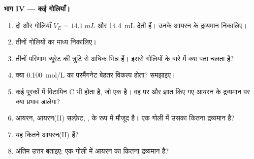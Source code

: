 \begin{problem}
\medskip
\noindent\textbf{भाग IV --- कई गोलियाँ।}
\begin{enumerate}[resume]
  \item दो और गोलियाँ $V_E = \qty{14.1}{mL}$ और
        \qty{14.4}{mL} देती हैं। उनके आयरन के द्रव्यमान निकालिए।
  \item तीनों गोलियों का माध्य निकालिए।
  \item तीनों परिणाम ब्यूरेट की त्रुटि से अधिक भिन्न हैं। इससे
        गोलियों के बारे में क्या पता चलता है?
  \item क्या \qty{0.100}{mol/L} का परमैंगनेट बेहतर
        विकल्प होता? समझाइए।
  \item कई पूरकों में विटामिन C भी होता है, जो एक  है। वह  पर
        और ज्ञात किए गए आयरन के द्रव्यमान पर क्या प्रभाव डालेगा?
  \item आयरन, आयरन(II) सल्फ़ेट, , के रूप में मौजूद है। एक गोली में उसका
        कितना द्रव्यमान है?
  \item यह कितने आयरन(II)  हैं?
  \item अंतिम उत्तर बताइए: एक गोली में आयरन का कितना द्रव्यमान
        है?
\end{enumerate}
\end{problem}
